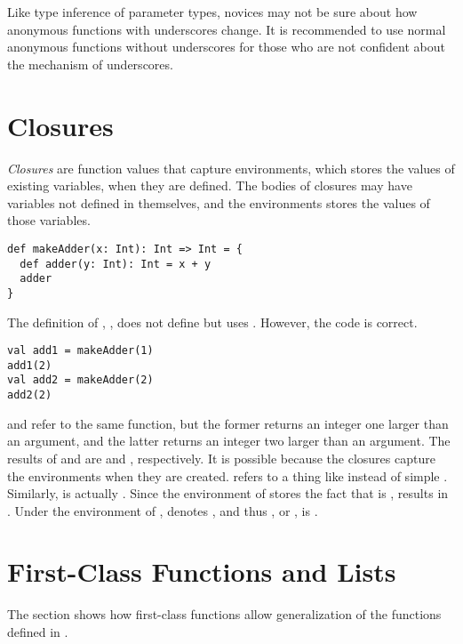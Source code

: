 Like type inference of parameter types, novices may not be sure about how
anonymous functions with underscores change. It is recommended to use normal anonymous
functions without underscores for those who are not confident about the mechanism
of underscores.

\section{Closures}

\textit{Closures} are function values that capture
environments, which stores the values of existing variables, when they are defined.
The bodies of closures may
have variables not defined in themselves, and the environments stores the values
of those variables.

\begin{verbatim}
def makeAdder(x: Int): Int => Int = {
  def adder(y: Int): Int = x + y
  adder
}
\end{verbatim}

The definition of , , does not
define but uses . However, the code is correct.

\begin{verbatim}
val add1 = makeAdder(1)
add1(2)
val add2 = makeAdder(2)
add2(2)
\end{verbatim}

 and  refer to the same  function, but the
former returns an integer one larger than an argument, and the latter returns an
integer two larger than an argument. The results of  and
 are  and , respectively. It is possible because the
closures capture the environments when they are created.  refers to a
thing like  instead of simple . Similarly,
 is actually . Since the environment of
 stores the fact that  is ,  results in
. Under the environment of ,  denotes , and
thus , or , is .

\section{First-Class Functions and Lists}

The section shows how first-class functions allow generalization of the functions
defined in .

